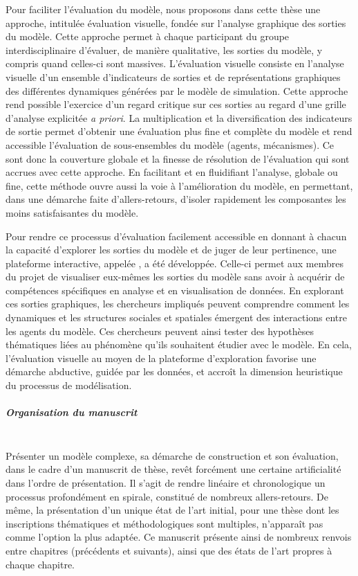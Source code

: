 Pour faciliter l'évaluation du modèle, nous proposons dans cette thèse une approche, intitulée \og évaluation visuelle\fg{}, fondée sur l'analyse graphique des sorties du modèle.
Cette approche permet à chaque participant du groupe interdisciplinaire d'évaluer, de manière qualitative, les sorties du modèle, y compris quand celles-ci sont massives.
L'évaluation visuelle consiste en l'analyse visuelle d'un ensemble d'\og{}indicateurs de sorties\fg{} et de représentations graphiques des différentes dynamiques générées par le modèle de simulation.
Cette approche rend possible l'exercice d'un regard critique sur ces sorties au regard d'une grille d'analyse explicitée \textit{a priori}.
La multiplication et la diversification des indicateurs de sortie permet d'obtenir une évaluation plus fine et complète du modèle et rend accessible l'évaluation de sous-ensembles du modèle (agents, mécanismes).
Ce sont donc la couverture globale et la finesse de résolution de l'évaluation qui sont accrues avec cette approche.
En facilitant et en fluidifiant l'analyse, globale ou fine, cette méthode ouvre aussi la voie à l'amélioration du modèle, en permettant, dans une démarche faite d'allers-retours, d'isoler rapidement les composantes les moins satisfaisantes du modèle.

Pour rendre ce processus d'évaluation facilement accessible en donnant à chacun la capacité d'explorer les sorties du modèle et de juger de leur pertinence, une plateforme interactive, appelée \og \simedb{}\fg{}, a été développée.
Celle-ci permet aux membres du projet de visualiser eux-mêmes les sorties du modèle sans avoir à acquérir de compétences spécifiques en analyse et en visualisation de données.
En explorant ces sorties graphiques, les chercheurs impliqués peuvent comprendre comment les dynamiques et les structures sociales et spatiales émergent des interactions entre les agents du modèle.
Ces chercheurs peuvent ainsi tester des hypothèses thématiques liées au phénomène qu'ils souhaitent étudier avec le modèle.
En cela, l'évaluation visuelle au moyen de la plateforme d'exploration favorise une démarche abductive, guidée par les données, et accroît la dimension heuristique du processus de modélisation.


\subparagraph{Organisation du manuscrit}\mbox{}\\
Présenter un modèle complexe, sa démarche de construction et son évaluation, dans le cadre d'un manuscrit de thèse, revêt forcément une certaine artificialité dans l'ordre de présentation.
Il s'agit de rendre linéaire et chronologique un processus profondément \og en spirale\fg{}, constitué de nombreux allers-retours.
De même, la présentation d'un unique état de l'art initial, pour une thèse dont les inscriptions thématiques et méthodologiques sont multiples, n'apparaît pas comme l'option la plus adaptée.
Ce manuscrit présente ainsi de nombreux renvois entre chapitres (précédents et suivants), ainsi que des états de l'art propres à chaque chapitre.

